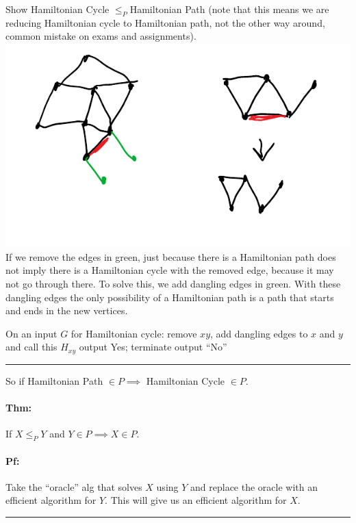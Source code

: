\documentclass[12 pt]{article}
\begin{document}
          Show Hamiltonian Cycle $\leq_P$Hamiltonian Path (note that
          this means we are reducing Hamiltonian cycle to Hamiltonian
          path, not the other way around, common mistake on exams and
          assignments).
          \\ \includegraphics[width=.9\textwidth]{i122.pdf}
          \\ If we remove the edges in green, just because there is a
          Hamiltonian path does not imply there is a Hamiltonian cycle
          with the removed edge, because it may not go through
          there. To solve this, we add dangling edges in green. With
          these dangling edges the only possibility of a Hamiltonian
          path is a path that starts and ends in the new vertices.

          \begin{algorithmic}
            \State On an input $G$ for Hamiltonian cycle:
                \State remove $xy$, add dangling edges to $x$ and $y$
                and call this $H_{xy}$
                 output Yes; terminate
                \EndIf
            \EndFor
            \State output ``No''
          \end{algorithmic}
          \noindent \rule{\textwidth}{0.5pt}
          So if Hamiltonian Path $\in P \implies$ Hamiltonian Cycle
          $\in P$.
          \paragraph{Thm:} If $X \leq_P Y$ and $Y \in P \implies X \in
          P$.
          \paragraph{Pf:} Take the ``oracle'' alg that solves $X$
          using $Y$ and replace the oracle with an efficient
          algorithm for $Y$. This will give us an efficient algorithm
          for $X$.
          \\ \noindent \rule{\textwidth}{0.5pt}
\end{document}
